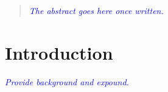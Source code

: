 \documentclass[onecolumn,draftcls]{IEEEtran}
\begin{document}
% 








\maketitle

\begin{abstract}
\textcolor{blue}{\textit{The abstract goes here once written.}}
\end{abstract}





%
\IEEEpeerreviewmaketitle



\section{Introduction} \label{sec:intro}
\textcolor{blue}{\textit{Provide background and expound.}}
\end{document}
